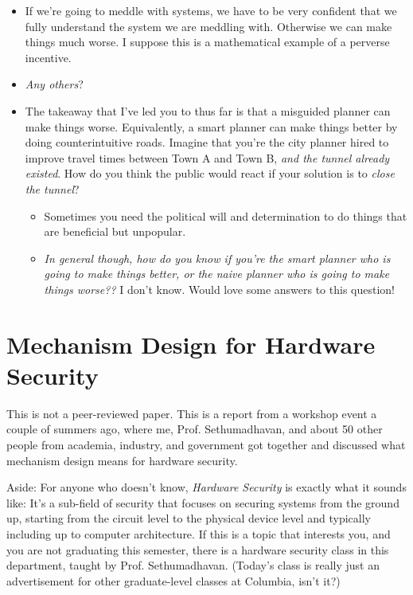 \documentclass[11pt]{article}
\begin{document}
\begin{itemize}
    \item If we're going to meddle with systems, we have to be very confident that we fully understand the system we are meddling with. Otherwise we can make things much worse. I suppose this is a mathematical example of a perverse incentive. 
    \item {\it Any others}?
    \item The takeaway that I've led you to thus far is that a misguided planner can make things worse. Equivalently, a smart planner can make things better by doing counterintuitive roads. Imagine that you're the city planner hired to improve travel times between Town A and Town B, {\it and the tunnel already existed}. How do you think the public would react if your solution is to {\it close the tunnel}?
    \begin{itemize}
        \item Sometimes you need the political will and determination to do things that are beneficial but unpopular.
        \item {\it In general though, how do you know if you're the smart planner who is going to make things better, or the naive planner who is going to make things worse??} I don't know. Would love some answers to this question! 
    \end{itemize}
\end{itemize}


\section{Mechanism Design for Hardware Security}

This is not a peer-reviewed paper. This is a report from a workshop event a couple of summers ago, where me, Prof. Sethumadhavan, and about 50 other people from academia, industry, and government got together and discussed what mechanism design means for hardware security. 

Aside: For anyone who doesn't know, {\it Hardware Security} is exactly what it sounds like: It's a sub-field of security that focuses on securing systems from the ground up, starting from the circuit level to the physical device level and typically including up to computer architecture. 
If this is a topic that interests you, and you are not graduating this semester, there is a hardware security class in this department, taught by Prof. Sethumadhavan. 
(Today's class is really just an advertisement for other graduate-level classes at Columbia, isn't it?)
\end{document}
